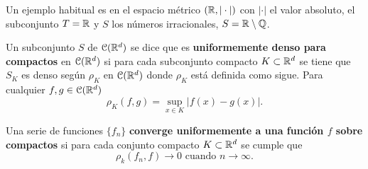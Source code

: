 Un ejemplo habitual es en el espacio métrico $(\mathbb{R}, |\cdot|)$ con $|\cdot|$ el valor absoluto, el subconjunto 
$T = \mathbb{R}$ y $S$ los números irracionales, $S = \mathbb{R} \setminus \mathbb{Q}$. 


\begin{definicion} 
    Un subconjunto $S$ de $\mathcal{C}(\mathbb{R}^d)$ se dice que es \textbf{uniformemente denso para compactos} en  $\mathcal{C}(\mathbb{R}^d)$
    si para cada subconjunto compacto $K \subset \mathbb{R}^d$ se tiene que $S_K$ es denso según $\rho_K$ en $\mathcal{C}(\mathbb{R}^d)$
    donde $\rho_K$ está definida como sigue.
    Para cualquier $f,g \in \mathcal{C}(\mathbb{R}^d)$ 
    \begin{equation}
        \rho _ K (f,g) = \sup_{x \in K} |f(x) - g(x)|.
    \end{equation}


      
\end{definicion}

\begin{definicion}
    Una serie de funciones $\{f_n\}$ \textbf{converge uniformemente a una función $f$ sobre compactos} si para 
    cada  conjunto compacto $K \subset \mathbb{R}^d$  se cumple que
    \begin{equation}
        \rho_k (f_n, f) \longrightarrow 0 \text{ cuando } n \longrightarrow \infty.
    \end{equation} 
\end{definicion}

